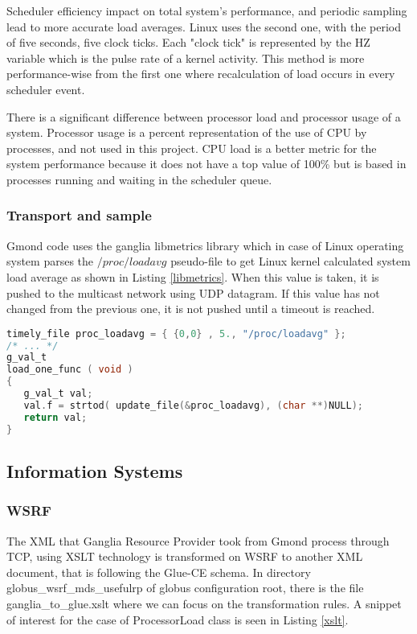 Scheduler efficiency impact on total system's performance, and periodic sampling lead to more accurate load averages. Linux uses the second one, with the period of five seconds, five clock ticks. Each "clock tick" is represented by the HZ variable which is the pulse rate of a kernel activity. This method is more performance-wise from the first one where recalculation of load occurs in every scheduler event. 

There is a significant difference between processor load and processor usage of a system. Processor usage is a percent representation of the use of CPU by processes, and not used in this project. CPU load is a better metric for the system performance because it does not have a top value of 100\% but is based in processes running and waiting in the scheduler queue.

\subsubsection{Transport and sample}
Gmond code uses the ganglia libmetrics library which in case of Linux operating system parses the $/proc/loadavg$ pseudo-file to get Linux kernel calculated system load average as shown in Listing \ref{libmetrics}. When this value is taken, it is pushed to the multicast network using UDP datagram. If this value has not changed from the previous one, it is not pushed until a timeout is reached.

\begin{lstlisting}[language=C,caption=libmetrics code to get load average,label=libmetrics]
timely_file proc_loadavg = { {0,0} , 5., "/proc/loadavg" };
/* ... */
g_val_t
load_one_func ( void )
{
   g_val_t val;
   val.f = strtod( update_file(&proc_loadavg), (char **)NULL);
   return val;
}
\end{lstlisting}

\subsection{Information Systems}

\subsubsection{WSRF}

The XML that Ganglia Resource Provider took from Gmond process through TCP, using XSLT technology is transformed on WSRF to another XML document, that is following the Glue-CE schema. In directory globus\_wsrf\_mds\_usefulrp of globus configuration root, there is the file ganglia\_to\_glue.xslt where we can focus on the transformation rules. A snippet of interest for the case of ProcessorLoad class is seen in Listing \ref{xslt}.

